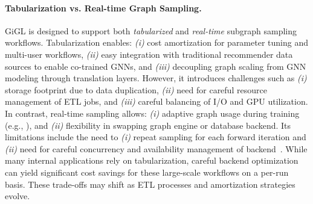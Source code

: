 \paragraph{Tabularization vs. Real-time Graph Sampling.} 
GiGL is designed to support both \emph{tabularized} and \emph{real-time} subgraph sampling workflows. Tabularization enables:
\emph{(i)} cost amortization for parameter tuning and multi-user workflows,
\emph{(ii)} easy integration with traditional recommender data sources to enable co-trained GNNs, and
\emph{(iii)} decoupling graph scaling from GNN modeling through translation layers.
However, it introduces challenges such as \emph{(i)} storage footprint due to data duplication, \emph{(ii)} need for careful resource management of ETL jobs, and \emph{(iii)} careful balancing of I/O and GPU utilization. In contrast, real-time sampling allows:
\emph{(i)} adaptive graph usage during training (e.g., \cite{han2022mlpinit, yoon2021performance}), and
\emph{(ii)} flexibility in swapping graph engine or database backend.
Its limitations include the need to \emph{(i)} repeat sampling for each forward iteration and \emph{(ii)} need for careful concurrency and availability management of backend~\cite{borisyuk2024lignn}. While many internal applications rely on tabularization, careful backend optimization can yield significant cost savings for these large-scale workflows on a per-run basis. These trade-offs may shift as ETL processes and amortization strategies evolve.

